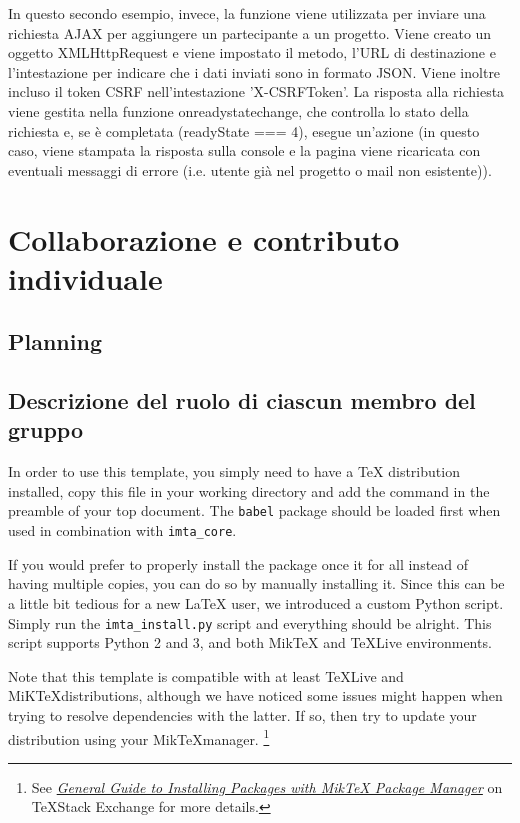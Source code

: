 \documentclass{report}
\begin{document}
In questo secondo esempio, invece, la funzione  viene utilizzata per inviare una richiesta AJAX per aggiungere un partecipante a un progetto. Viene creato un oggetto XMLHttpRequest e viene impostato il metodo, l'URL di destinazione e l'intestazione  per indicare che i dati inviati sono in formato JSON. Viene inoltre incluso il token CSRF nell'intestazione 'X-CSRFToken'. La risposta alla richiesta viene gestita nella funzione onreadystatechange, che controlla lo stato della richiesta e, se è completata (readyState === 4), esegue un'azione (in questo caso, viene stampata la risposta sulla console e la pagina viene ricaricata con eventuali messaggi di errore (i.e. utente già nel progetto o mail non esistente)).

\chapter{Collaborazione e contributo individuale}
\section{Planning}
\section{Descrizione del ruolo di ciascun membro del gruppo}

In order to use this template, you simply need to have a \TeX{} distribution installed, copy this file in your working directory and add the  command in the preamble of your top document. 
The \texttt{babel} package should be loaded first when used in combination with \texttt{imta\_core}.

If you would prefer to properly install the package once it for all instead of having multiple copies, you can do so by manually installing it. 
Since this can be a little bit tedious for a new \LaTeX{} user, we introduced a custom Python script. 
Simply run the \texttt{imta\_install.py} script and everything should be alright.
This script supports Python 2 and 3, and both Mik\TeX{} and \TeX{}Live environments. 

Note that this template is compatible with at least \TeX Live and MiK\TeX distributions, although we have noticed some issues might happen when trying to resolve dependencies with the latter. 
If so, then try to update your distribution using your Mik\TeX manager.
\footnote{See \textit{\href{https://tex.stackexchange.com/a/359851}{General Guide to Installing Packages with MikTeX Package Manager}} on \TeX Stack Exchange for more details.}
\end{document}
